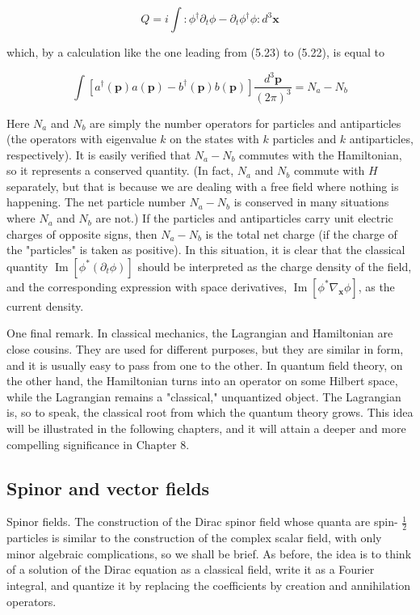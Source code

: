 \documentclass[10pt, letterpaper]{article}
\begin{document}
$$
Q=i \int: \phi^{\dagger} \partial_{t} \phi-\partial_{t} \phi^{\dagger} \phi: d^{3} \mathbf{x}
$$

which, by a calculation like the one leading from (5.23) to (5.22), is equal to

$$
\int\left[a^{\dagger}(\mathbf{p}) a(\mathbf{p})-b^{\dagger}(\mathbf{p}) b(\mathbf{p})\right] \frac{d^{3} \mathbf{p}}{(2 \pi)^{3}}=N_{a}-N_{b}
$$

Here $N_{a}$ and $N_{b}$ are simply the number operators for particles and antiparticles (the operators with eigenvalue $k$ on the states with $k$ particles and $k$ antiparticles, respectively). It is easily verified that $N_{a}-N_{b}$ commutes with the Hamiltonian, so it represents a conserved quantity. (In fact, $N_{a}$ and $N_{b}$ commute with $H$ separately, but that is because we are dealing with a free field where nothing is happening. The net particle number $N_{a}-N_{b}$ is conserved in many situations where $N_{a}$ and $N_{b}$ are not.) If the particles and antiparticles carry unit electric charges of opposite signs, then $N_{a}-N_{b}$ is the total net charge (if the charge of the "particles" is taken as positive). In this situation, it is clear that the classical quantity $\operatorname{Im}\left[\phi^{*}\left(\partial_{t} \phi\right)\right]$ should be interpreted as the charge density of the field, and the corresponding expression with space derivatives, $\operatorname{Im}\left[\phi^{*} \nabla_{\mathbf{x}} \phi\right]$, as the current density.

One final remark. In classical mechanics, the Lagrangian and Hamiltonian are close cousins. They are used for different purposes, but they are similar in form, and it is usually easy to pass from one to the other. In quantum field theory, on the other hand, the Hamiltonian turns into an operator on some Hilbert space, while the Lagrangian remains a "classical," unquantized object. The Lagrangian is, so to speak, the classical root from which the quantum theory grows. This idea will be illustrated in the following chapters, and it will attain a deeper and more compelling significance in Chapter 8.

\subsection*{Spinor and vector fields}
Spinor fields. The construction of the Dirac spinor field whose quanta are spin- $\frac{1}{2}$ particles is similar to the construction of the complex scalar field, with only minor algebraic complications, so we shall be brief. As before, the idea is to think of a solution of the Dirac equation as a classical field, write it as a Fourier integral, and quantize it by replacing the coefficients by creation and annihilation operators.
\end{document}
